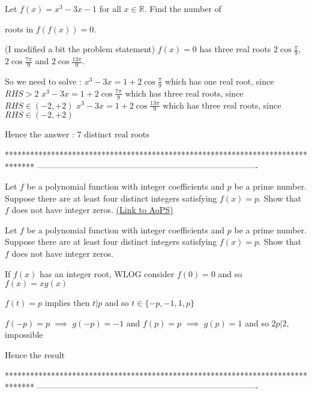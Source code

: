 \begin{solution}
	\begin{tcolorbox}Let $f(x)=x^{3} -3x - 1$ for all $x \in \mathbb{R}$. Find the number of  roots in  $f(f(x))=0$.\end{tcolorbox}
(I modified a bit the problem statement)
$f(x)=0$ has  three real roots $2\cos\frac{\pi}9$, $2\cos\frac{7\pi}9$ and $2\cos\frac{13\pi}9$.

So we need to solve :
$x^3-3x=1+2\cos\frac{\pi}9$ which has one real root, since $RHS>2$
$x^3-3x=1+2\cos\frac{7\pi}9$ which has three real roots, since $RHS\in(-2,+2)$
$x^3-3x=1+2\cos\frac{13\pi}9$ which has three real roots, since $RHS\in(-2,+2)$

Hence the answer : $\boxed{7\text{ distinct real roots}}$
\end{solution}
*******************************************************************************
-------------------------------------------------------------------------------

\begin{problem}
	Let $f$ be a polynomial function with integer coefficients and $p$ be a prime number. Suppose there are at least four distinct integers satisfying $f(x) = p$. Show that $f$ does not have integer zeros.
	\flushright \href{https://artofproblemsolving.com/community/c6h609876}{(Link to AoPS)}
\end{problem}



\begin{solution}
	\begin{tcolorbox}Let $f$ be a polynomial function with integer coefficients and $p$ be a prime number. Suppose there are at least four distinct integers satisfying $f(x) = p$. Show that $f$ does not have integer zeros.\end{tcolorbox}
If $f(x)$ has an integer root, WLOG consider $f(0)=0$ and so $f(x)=xg(x)$

$f(t)=p$ implies then $t|p$ and so $t\in\{-p,-1,1,p\}$

$f(-p)=p$ $\implies$ $g(-p)=-1$ and $f(p)=p$ $\implies$ $g(p)=1$ and so $2p|2$, impossible

Hence the result
\end{solution}
*******************************************************************************
-------------------------------------------------------------------------------

